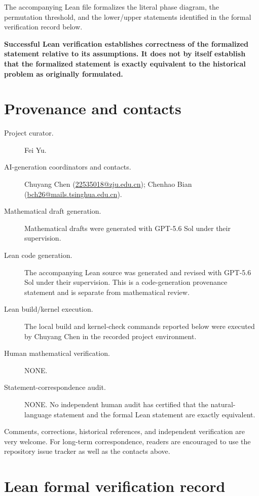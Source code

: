 \documentclass[11pt]{article}
\begin{document}
\medskip
\noindent The accompanying Lean file formalizes the literal phase diagram, the permutation threshold, and the lower/upper statements identified in the formal verification record below.

\medskip
\noindent\textbf{Successful Lean verification establishes correctness of the formalized statement relative to its assumptions. It does not by itself establish that the formalized statement is exactly equivalent to the historical problem as originally formulated.}
\endgroup

\section*{Provenance and contacts}
\begingroup\small\sloppy
\begin{description}
\item[Project curator.] Fei Yu.
\item[AI-generation coordinators and contacts.] Chuyang Chen (\href{mailto:22535018@zju.edu.cn}{22535018@zju.edu.cn}); Chenhao Bian (\href{mailto:bch26@mails.tsinghua.edu.cn}{bch26@mails.tsinghua.edu.cn}).
\item[Mathematical draft generation.] Mathematical drafts were generated with GPT-5.6 Sol under their supervision.
\item[Lean code generation.] The accompanying Lean source was generated and revised with GPT-5.6 Sol under their supervision. This is a code-generation provenance statement and is separate from mathematical review.
\item[Lean build/kernel execution.] The local build and kernel-check commands reported below were executed by Chuyang Chen in the recorded project environment.
\item[Human mathematical verification.] NONE.
\item[Statement-correspondence audit.] NONE. No independent human audit has certified that the natural-language statement and the formal Lean statement are exactly equivalent.
\end{description}
\medskip
\noindent Comments, corrections, historical references, and independent verification are very welcome. For long-term correspondence, readers are encouraged to use the repository issue tracker as well as the contacts above.
\endgroup

\section*{Lean formal verification record}
\end{document}
